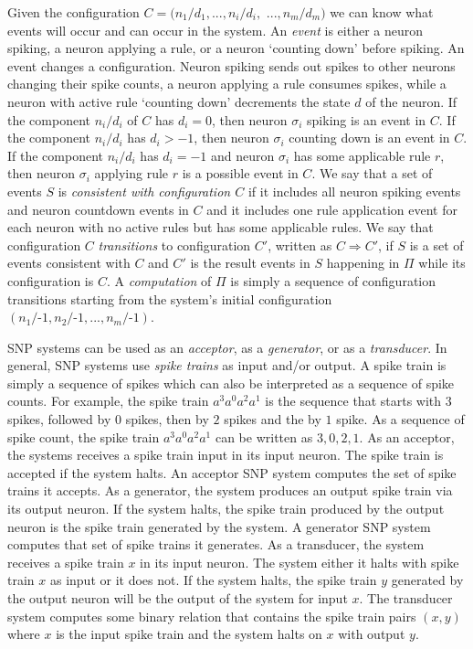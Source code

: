 \documentclass[]{elsarticle}
\theoremstyle{definition}
\theoremstyle{definition}
\newcommand{\mn}{\text{-}}
\begin{document}
Given the configuration $C=(n_1/d_1,...,n_i/d_i,$ $...,n_m/d_m)$ we can know what events will occur 
and can occur in the system. An \emph{event} is either a neuron spiking, a neuron applying a rule, 
or a neuron `counting down' before spiking. An event changes a configuration. Neuron spiking sends 
out spikes to other neurons changing their spike counts, a neuron applying a rule consumes spikes, 
while a neuron with active rule `counting down' decrements the state $d$ of the neuron. If the 
component $n_i/d_i$ of $C$ has $d_i=0$, then neuron $\sigma_i$ spiking is an event in $C$. If the 
component $n_i/d_i$ has $d_i > -1$, then neuron $\sigma_i$ counting down is an event in $C$. If the 
component $n_i/d_i$ has $d_i=-1$ and neuron $\sigma_i$ has some applicable rule $r$, then neuron 
$\sigma_i$ applying rule $r$ is a possible event in $C$. We say that a set of events $S$ is
\emph{consistent with configuration $C$} if it includes all neuron spiking events and neuron 
countdown events in $C$ and it includes one rule application event for each neuron with no active 
rules but has some applicable rules. We say that configuration $C$ \emph{transitions} to 
configuration $C'$, written as $C \Rightarrow C'$, if $S$ is a set of events consistent with $C$ and
$C'$ is the result events in $S$ happening in $\Pi$ while its configuration is $C$. A 
\emph{computation} of $\Pi$ is simply a sequence of configuration transitions starting from the 
system's initial configuration $(n_1/\mn 1,n_2/\mn 1,...,n_m/\mn 1)$.

SNP systems can be used as an \emph{acceptor}, as a \emph{generator}, or as a \emph{transducer}. In
general, SNP systems use \emph{spike trains} as input and/or output. A spike train is simply a 
sequence of spikes which can also be interpreted as a sequence of spike counts. For example, the
spike train $a^3a^0a^2a^1$ is the sequence that starts with $3$ spikes, followed by $0$ spikes, then
by $2$ spikes and the by $1$ spike. As a sequence of spike count, the spike train $a^3a^0a^2a^1$
can be written as $3,0,2,1$. As an acceptor, the systems receives a spike train input in its input 
neuron. The spike train is accepted if the system halts. An acceptor SNP system computes the set of 
spike trains it accepts. As a generator, the system produces an output spike train via its output 
neuron. If the system halts, the spike train produced by the output neuron is the spike train 
generated by the system. A generator SNP system computes that set of spike trains it generates. As
a transducer, the system receives a spike train $x$ in its input neuron. The system either 
it halts with spike train $x$ as input or it does not. If the system halts, the spike train $y$
generated by the output neuron will be the output of the system for input $x$. The transducer system
computes some binary relation that contains the spike train pairs $(x,y)$ where $x$ is the input
spike train and the system halts on $x$ with output $y$.
\end{document}
